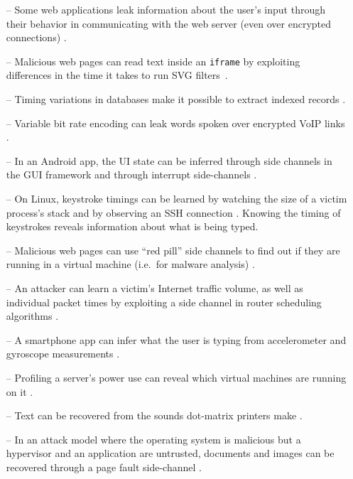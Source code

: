 \documentclass[letterpaper,twocolumn,10pt]{article}
\begin{document}
\begin{itemize}
    \item[--] Some web applications leak information about the user's input through
          their behavior in communicating with the web server (even over
          encrypted connections) \cite{bortz2007exposing, chen2010side}.
      \item[--] Malicious web pages can read text inside an \texttt{iframe} by
          exploiting differences in the time it takes to run SVG
          filters~\cite{pixelperfect, andrysco2015subnormal}. 
    \item[--] Timing variations in databases make it possible to extract
          indexed records \cite{futoransky2007nd2db}.
    \item[--] Variable bit rate encoding can leak words spoken over encrypted
        VoIP links \cite{white2011phonotactic}.
    \item[--] In an Android app, the UI state can be inferred through side channels
          in the GUI framework \cite{chen2014peeking} and through interrupt
          side-channels \cite{diao2016no}.
    \item[--] On Linux, keystroke timings can be learned by watching the size of
          a victim process's stack \cite{zhang2009peeping} and by observing an
          SSH connection \cite{song2001timing}. Knowing the timing of keystrokes
          reveals information about what is being typed.
    \item[--] Malicious web pages can use ``red pill'' side channels to find out if
          they are running in a virtual machine (i.e.\ for malware analysis)
          \cite{ho2014tick}.
    \item[--] An attacker can learn a victim's Internet traffic volume, as well as
          individual packet times by exploiting a side channel in router
          scheduling algorithms \cite{kadloor2010low}.
    \item[--] A smartphone app can infer what the user is typing from accelerometer
          and gyroscope measurements \cite{owusu2012accessory,
          cai2012practicality}.
    \item[--] Profiling a server's power use can reveal which virtual machines
        are running on it \cite{hlavacs2011energy}.
    \item[--] Text can be recovered from the sounds dot-matrix printers make
          \cite{backes2010acoustic}.
    \item[--] In an attack model where the operating system is malicious but
        a hypervisor and an application are untrusted, documents and images can
        be recovered through a page fault side-channel \cite{xu2011exploration}.
\end{itemize}
\end{document}
